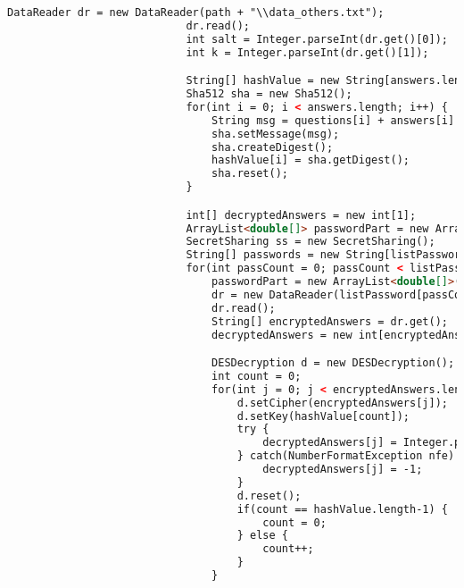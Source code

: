\begin{lstlisting}[language=html,basicstyle=\tiny,caption=retrieve\_process.jsp]
                            DataReader dr = new DataReader(path + "\\data_others.txt");
                            dr.read();
                            int salt = Integer.parseInt(dr.get()[0]);
                            int k = Integer.parseInt(dr.get()[1]);

                            String[] hashValue = new String[answers.length];
                            Sha512 sha = new Sha512();
                            for(int i = 0; i < answers.length; i++) {
                                String msg = questions[i] + answers[i] + salt;
                                sha.setMessage(msg);
                                sha.createDigest();
                                hashValue[i] = sha.getDigest();
                                sha.reset();
                            }

                            int[] decryptedAnswers = new int[1];
                            ArrayList<double[]> passwordPart = new ArrayList<double[]>();
                            SecretSharing ss = new SecretSharing();
                            String[] passwords = new String[listPassword.length];
                            for(int passCount = 0; passCount < listPassword.length; passCount++) {
                                passwordPart = new ArrayList<double[]>();
                                dr = new DataReader(listPassword[passCount].getAbsolutePath());
                                dr.read();
                                String[] encryptedAnswers = dr.get();
                                decryptedAnswers = new int[encryptedAnswers.length];

                                DESDecryption d = new DESDecryption();
                                int count = 0;
                                for(int j = 0; j < encryptedAnswers.length; j++) {
                                    d.setCipher(encryptedAnswers[j]);
                                    d.setKey(hashValue[count]);
                                    try {
                                        decryptedAnswers[j] = Integer.parseInt(d.binToStr(d.decrypt()).trim());
                                    } catch(NumberFormatException nfe) {
                                        decryptedAnswers[j] = -1;
                                    }
                                    d.reset();
                                    if(count == hashValue.length-1) {
                                        count = 0;
                                    } else {
                                        count++;
                                    }
                                }


\end{lstlisting}
